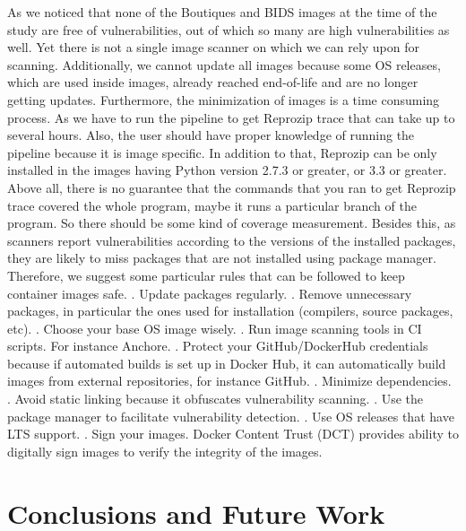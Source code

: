 \documentclass[a4paper,num-refs]{oup-contemporary}
\begin{document}
As we noticed that none of the Boutiques and BIDS images at the time of the study are free of vulnerabilities, out of which
so many are high vulnerabilities as well. Yet there is not a single image scanner on which we can rely upon for
scanning. Additionally, we cannot update all images because some OS releases, which are used inside images, 
already reached end-of-life and are
no longer getting updates. Furthermore, the minimization of images is a time consuming process. As we have to run
the pipeline to get Reprozip trace that can take up to several hours. Also, the user should have proper knowledge
of running the pipeline because it is image specific. In addition to that, Reprozip can be only installed
in the images having Python version 2.7.3 or greater, or 3.3 or greater. Above all, there is no guarantee that
the commands that you ran to get Reprozip trace covered the whole program, maybe it runs a particular
branch of the program. So there should be some kind of coverage measurement.
Besides this, as scanners report vulnerabilities according to the versions of the installed packages,
they are likely to miss packages that are not installed using package manager. 
Therefore, we suggest some particular rules that can be
followed to keep container images safe.
. Update packages regularly.
. Remove unnecessary packages, in particular the ones used for installation (compilers, source packages, etc).
. Choose your base OS image wisely.
. Run image scanning tools in CI scripts. For instance Anchore.
. Protect your GitHub/DockerHub credentials because if automated builds is set up
in Docker Hub, it can automatically build images from external repositories, for instance GitHub.
. Minimize dependencies.
. Avoid static linking because it obfuscates vulnerability scanning.
. Use the package manager to facilitate vulnerability detection.
. Use OS releases that have LTS support.
. Sign your images. Docker Content Trust (DCT) provides ability to digitally sign
images to verify the integrity of the images.

\section{Conclusions and Future Work}
\end{document}
